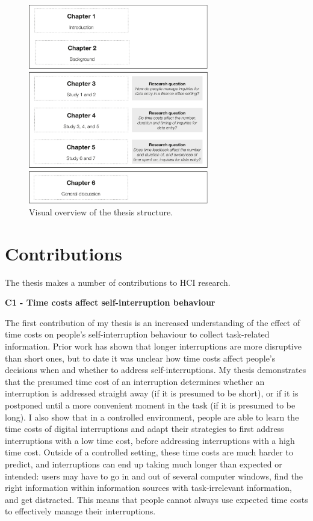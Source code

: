 \begin{figure}
\centering
\includegraphics[width=0.7\textwidth]{images/ThesisOverview.pdf}
\caption{Visual overview of the thesis structure.}
\label{fig:ch1-thesisoverview}
\end{figure}

\pagebreak

\section{Contributions}
The thesis makes a number of contributions to HCI research. 

\textbf{C1 - Time costs affect self-interruption behaviour}

The first contribution of my thesis is an increased understanding of the effect of time costs on people's self-interruption behaviour to collect task-related information. Prior work has shown that longer interruptions are more disruptive than short ones, but to date it was unclear how time costs affect people's decisions when and whether to address self-interruptions. My thesis demonstrates that the presumed time cost of an interruption determines whether an interruption is addressed straight away (if it is presumed to be short), or if it is postponed until a more convenient moment in the task (if it is presumed to be long). I also show that in a controlled environment, people are able to learn the time costs of digital interruptions and adapt their strategies to first address interruptions with a low time cost, before addressing interruptions with a high time cost. Outside of a controlled setting, these time costs are much harder to predict, and interruptions can end up taking much longer than expected or intended: users may have to go in and out of several computer windows, find the right information within information sources with task-irrelevant information, and get distracted. This means that people cannot always use expected time costs to effectively manage their interruptions. 

